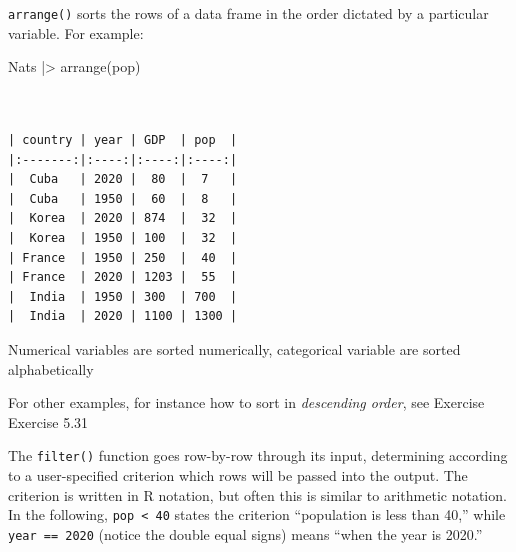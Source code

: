 \documentclass[
  letterpaper,
  DIV=11,
  numbers=noendperiod,
  oneside]{scrartcl}
\newenvironment{Shaded}{\begin{snugshade}}{\end{snugshade}}
\newcommand{\FunctionTok}[1]{\textcolor[rgb]{0.28,0.35,0.67}{#1}}
\newcommand{\NormalTok}[1]{\textcolor[rgb]{0.00,0.23,0.31}{#1}}
\newcommand{\SpecialCharTok}[1]{\textcolor[rgb]{0.37,0.37,0.37}{#1}}
\begin{document}
\begin{tcolorbox}[enhanced jigsaw, colbacktitle=quarto-callout-note-color!10!white, opacityback=0, breakable, opacitybacktitle=0.6, colback=white, coltitle=black, arc=.35mm, title={1. arrange()}, left=2mm, colframe=quarto-callout-note-color-frame, rightrule=.15mm, bottomrule=.15mm, leftrule=.75mm, bottomtitle=1mm, toptitle=1mm, titlerule=0mm, toprule=.15mm]

\end{tcolorbox}

\texttt{arrange()} sorts the rows of a data frame in the order dictated
by a particular variable. For example:

\begin{Shaded}
\begin{Highlighting}[]
\NormalTok{Nats }\SpecialCharTok{|\textgreater{}} \FunctionTok{arrange}\NormalTok{(pop)}
\end{Highlighting}
\end{Shaded}

\begin{verbatim}


| country | year | GDP  | pop  |
|:-------:|:----:|:----:|:----:|
|  Cuba   | 2020 |  80  |  7   |
|  Cuba   | 1950 |  60  |  8   |
|  Korea  | 2020 | 874  |  32  |
|  Korea  | 1950 | 100  |  32  |
| France  | 1950 | 250  |  40  |
| France  | 2020 | 1203 |  55  |
|  India  | 1950 | 300  | 700  |
|  India  | 2020 | 1100 | 1300 |
\end{verbatim}

Numerical variables are sorted numerically, categorical variable are
sorted alphabetically

For other examples, for instance how to sort in \emph{descending order},
see Exercise Exercise 5.31

\begin{tcolorbox}[enhanced jigsaw, colbacktitle=quarto-callout-note-color!10!white, opacityback=0, breakable, opacitybacktitle=0.6, colback=white, coltitle=black, arc=.35mm, title={2. filter()}, left=2mm, colframe=quarto-callout-note-color-frame, rightrule=.15mm, bottomrule=.15mm, leftrule=.75mm, bottomtitle=1mm, toptitle=1mm, titlerule=0mm, toprule=.15mm]

\end{tcolorbox}

The \texttt{filter()} function goes row-by-row through its input,
determining according to a user-specified criterion which rows will be
passed into the output. The criterion is written in R notation, but
often this is similar to arithmetic notation. In the following,
\texttt{pop\ \textless{}\ 40} states the criterion ``population is less
than 40,'' while \texttt{year\ ==\ 2020} (notice the double equal signs)
means ``when the year is 2020.''
\end{document}
